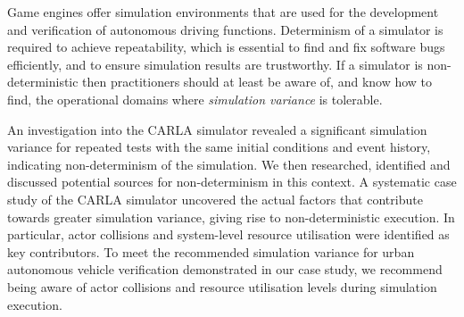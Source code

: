 \documentclass[letterpaper, 10 pt, journal, twoside]{IEEEtran}
\begin{document}

Game engines offer simulation environments that are used for the development and verification of autonomous driving functions. 
%
Determinism of a simulator is required to achieve repeatability, which is essential to find and fix software bugs efficiently, and to ensure simulation results are trustworthy. 
%
If a simulator is non-deterministic then practitioners should at least be aware of, and know how to find, the operational domains where \textit{simulation variance} is tolerable. 

An investigation into the CARLA simulator revealed a significant simulation variance for repeated tests with the same initial conditions and event history, indicating non-determinism of the simulation. 
%
We then researched, identified and discussed potential sources for non-determinism in this context.
%
A systematic case study of the CARLA simulator uncovered the actual factors that contribute towards greater simulation variance, giving rise to non-deterministic execution. In particular, actor collisions and system-level resource utilisation were identified as key contributors. 
%
To meet the recommended simulation variance for urban autonomous vehicle verification demonstrated in our case study, we recommend being aware of actor collisions and resource utilisation levels during simulation execution.  
%
\end{document}
